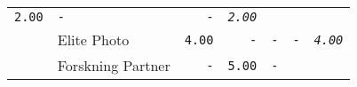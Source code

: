 \documentclass[11pt,A4paper,]{article}
\begin{document}
\begin{longtable}[]{@{}llrrrrr@{}}
\begin{minipage}[t]{0.14\columnwidth}
\texttt{2.00}\strut
\end{minipage} & \begin{minipage}[t]{0.14\columnwidth}\raggedleft\strut
\texttt{-}\strut
\end{minipage} & \begin{minipage}[t]{0.14\columnwidth}\raggedleft\strut
\texttt{-}\strut
\end{minipage} & \begin{minipage}[t]{0.14\columnwidth}\raggedleft\strut
\emph{\texttt{2.00}}\strut
\end{minipage}\tabularnewline
\begin{minipage}[t]{0.14\columnwidth}\raggedright\strut
\strut
\end{minipage} & \begin{minipage}[t]{0.14\columnwidth}\raggedright\strut
Elite Photo\strut
\end{minipage} & \begin{minipage}[t]{0.14\columnwidth}\raggedleft\strut
\texttt{4.00}\strut
\end{minipage} & \begin{minipage}[t]{0.14\columnwidth}\raggedleft\strut
\texttt{-}\strut
\end{minipage} & \begin{minipage}[t]{0.14\columnwidth}\raggedleft\strut
\texttt{-}\strut
\end{minipage} & \begin{minipage}[t]{0.14\columnwidth}\raggedleft\strut
\texttt{-}\strut
\end{minipage} & \begin{minipage}[t]{0.14\columnwidth}\raggedleft\strut
\emph{\texttt{4.00}}\strut
\end{minipage}\tabularnewline
\begin{minipage}[t]{0.14\columnwidth}\raggedright\strut
\strut
\end{minipage} & \begin{minipage}[t]{0.14\columnwidth}\raggedright\strut
Forskning Partner\strut
\end{minipage} & \begin{minipage}[t]{0.14\columnwidth}\raggedleft\strut
\texttt{-}\strut
\end{minipage} & \begin{minipage}[t]{0.14\columnwidth}\raggedleft\strut
\texttt{5.00}\strut
\end{minipage} & \begin{minipage}[t]{0.14\columnwidth}\raggedleft\strut
\texttt{-}\strut
\end{minipage} & \begin{minipage}[t]{0.14\columnwidth}\raggedleft\strut

\end{minipage}
\end{longtable}
\end{document}
